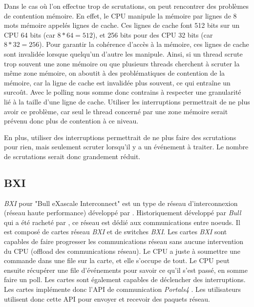 Dans le cas où l'on effectue trop de scrutations, on peut rencontrer des problèmes de contention mémoire.
En effet, le CPU manipule la mémoire par lignes de 8 mots mémoire appelés lignes de cache.
Ces lignes de cache font 512 bits sur un CPU 64 bits (car $8 * 64 = 512$), et 256 bits pour
des CPU 32 bits (car $8 * 32 = 256$).
Pour garantir la cohérence d'accès à la mémoire, ces lignes de cache sont invalidée lorsque quelqu'un d'autre les manipule.
Ainsi, si un thread scrute trop souvent une zone mémoire ou que plusieurs threads cherchent à scruter la même zone mémoire,
on aboutit à des problématiques de contention de la mémoire, car la ligne de cache est invalidée plus souvent, ce qui entraîne un surcoût.
Avec le polling nous somme donc contrains à respecter une granularité lié à la taille d'une ligne de cache.
Utiliser les interruptions permettrait de ne plus avoir ce problème, car seul le thread concerné par une zone mémoire serait prévenu donc plus de contention à ce niveau.

En plus, utiliser des interruptions permettrait de ne plus faire des scrutations pour rien,
mais seulement scruter lorsqu'il y a un événement à traiter.
Le nombre de scrutations serait donc grandement réduit.

\subsection{BXI}

\emph{BXI} \cite{7312662} pour "Bull eXascale Interconnect" est un type de réseau d'interconnexion (réseau haute performance) développé par \atos{}.
Historiquement développé par \emph{Bull} qui a été racheté par \atos{}, ce réseau est dédié aux communications entre noeuds.
Il est composé de cartes réseau \emph{BXI} et de switches \emph{BXI}.
Les cartes \emph{BXI} sont capables de faire progresser les communications réseau sans aucune intervention du CPU (offload des communications réseau).
Le CPU a juste à soumettre une commande dans une file sur la carte, et elle s'occupe de tout.
Le CPU peut ensuite récupérer une file d'événements pour savoir ce qu'il s'est passé, en somme faire un poll.
Les cartes sont également capables de déclencher des interruptions.
Les cartes implémente donc l'API de communication \emph{Portals4} \cite{portals4}.
Les utilisateurs utilisent donc cette API pour envoyer et recevoir des paquets réseau.


